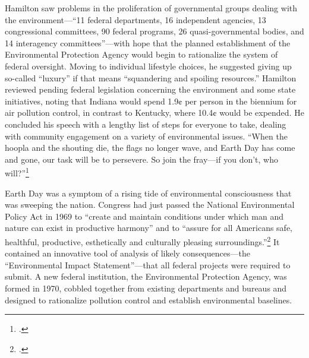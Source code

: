\documentclass[
  american,
  letterpaper,
]{scrreprt}
\begin{document}
Hamilton saw problems in the proliferation of governmental groups
dealing with the environment---``11 federal departments, 16 independent
agencies, 13 congressional committees, 90 federal programs, 26
quasi-governmental bodies, and 14 interagency committees''---with hope
that the planned establishment of the Environmental Protection Agency
would begin to rationalize the system of federal oversight. Moving to
individual lifestyle choices, he suggested giving up so-called
``luxury'' if that means ``squandering and spoiling resources.''
Hamilton reviewed pending federal legislation concerning the environment
and some state initiatives, noting that Indiana would spend 1.9¢ per
person in the biennium for air pollution control, in contrast to
Kentucky, where 10.4¢ would be expended. He concluded his speech with a
lengthy list of steps for everyone to take, dealing with community
engagement on a variety of environmental issues. ``When the hoopla and
the shouting die, the flags no longer wave, and Earth Day has come and
gone, our task will be to persevere. So join the fray---if you don't,
who will?''\footnote{.}

Earth Day was a symptom of a rising tide of environmental consciousness
that was sweeping the nation. Congress had just passed the National
Environmental Policy Act in 1969 to ``create and maintain conditions
under which man and nature can exist in productive harmony'' and to
``assure for all Americans safe, healthful, productive, esthetically and
culturally pleasing surroundings.''\footnote{.} It contained an innovative tool of analysis of likely
consequences---the ``Environmental Impact Statement''---that all federal
projects were required to submit. A new federal institution, the
Environmental Protection Agency, was formed in 1970, cobbled together
from existing departments and bureaus and designed to rationalize
pollution control and establish environmental baselines.
\end{document}
